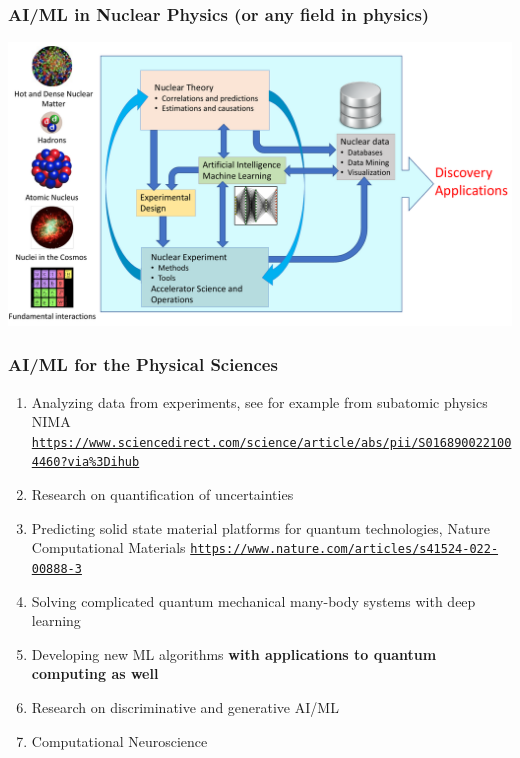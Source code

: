 \documentclass{beamer}
\begin{document}
\begin{frame}
\frametitle{AI/ML in Nuclear  Physics (or any field in physics)}

\vspace{6mm}

\centerline{\includegraphics[width=1.0\linewidth]{figures/ML-NP.pdf}}

\vspace{6mm}
\end{frame}

\begin{frame}
\frametitle{AI/ML for the Physical Sciences}

\begin{block}{}
\begin{enumerate}
\item Analyzing data from experiments, see for example from subatomic physics NIMA \href{{https://www.sciencedirect.com/science/article/abs/pii/S0168900221004460?via%3Dihub}}{\nolinkurl{https://www.sciencedirect.com/science/article/abs/pii/S0168900221004460?via\%3Dihub}}

\item Research on quantification of uncertainties

\item Predicting solid state material platforms for quantum technologies, Nature Computational Materials \href{{https://www.nature.com/articles/s41524-022-00888-3}}{\nolinkurl{https://www.nature.com/articles/s41524-022-00888-3}}

\item Solving complicated quantum mechanical many-body systems with deep learning

\item Developing new ML  algorithms \textbf{with applications to quantum computing as well}

\item Research on discriminative and generative AI/ML

\item Computational Neuroscience
\end{enumerate}

\noindent
\end{block}
\end{frame}
\end{document}
